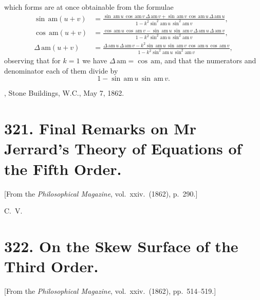\documentclass[11pt,a4paper]{article}
\theoremstyle{plain}
\begin{document}
which forms are at once obtainable from the formulae
\begin{align*}
\sin\,\mathrm{am}(u+v) &= \frac{\sin\,\mathrm{am}\,u\,\cos\,\mathrm{am}\,v\,\Delta\,\mathrm{am}\,v + \sin\,\mathrm{am}\,v\,\cos\,\mathrm{am}\,u\,\Delta\,\mathrm{am}\,u}{1 - k^2\sin^2\!\mathrm{am}\,u\,\sin^2\!\mathrm{am}\,v}, \\
\cos\,\mathrm{am}(u+v) &= \frac{\cos\,\mathrm{am}\,u\,\cos\,\mathrm{am}\,v - \sin\,\mathrm{am}\,u\,\sin\,\mathrm{am}\,v\,\Delta\,\mathrm{am}\,u\,\Delta\,\mathrm{am}\,v}{1 - k^2\sin^2\!\mathrm{am}\,u\,\sin^2\!\mathrm{am}\,v}, \\
\Delta\,\mathrm{am}(u+v) &= \frac{\Delta\,\mathrm{am}\,u\,\Delta\,\mathrm{am}\,v - k^2\sin\,\mathrm{am}\,u\,\sin\,\mathrm{am}\,v\,\cos\,\mathrm{am}\,u\,\cos\,\mathrm{am}\,v}{1 - k^2\sin^2\!\mathrm{am}\,u\,\sin^2\!\mathrm{am}\,v},
\end{align*}
observing that for $k=1$ we have $\Delta\,\mathrm{am} = \cos\,\mathrm{am}$, and that the numerators and denominator each of them divide by
\[
1 - \sin\,\mathrm{am}\,u\,\sin\,\mathrm{am}\,v.
\]

\medskip
{}, Stone Buildings, W.C., May 7, 1862.


\newpage
\section*{321. Final Remarks on Mr Jerrard's Theory of Equations of the Fifth Order.}

[From the \textit{Philosophical Magazine}, vol.\ xxiv.\ (1862), p.\ 290.]

\medskip

\noindent C.\ V.


\newpage
\section*{322. On the Skew Surface of the Third Order.}

[From the \textit{Philosophical Magazine}, vol.\ xxiv.\ (1862), pp.\ 514--519.]
\end{document}
